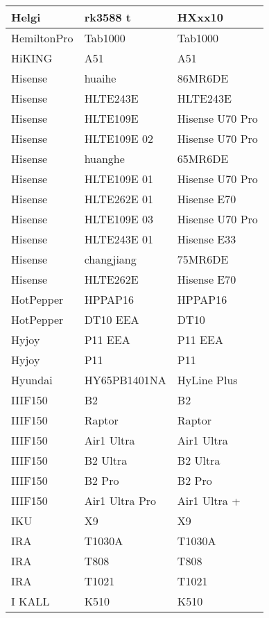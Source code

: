 \begin{tabularx}{\linewidth}{|l|X|X|}
        Helgi & rk3588 t & HXxx10 \\ \hline
        HemiltonPro & Tab1000 & Tab1000 \\ \hline
        HiKING & A51 & A51 \\ \hline
        Hisense & huaihe & 86MR6DE \\ \hline
        Hisense & HLTE243E & HLTE243E \\ \hline
        Hisense & HLTE109E & Hisense U70 Pro \\ \hline
        Hisense & HLTE109E 02 & Hisense U70 Pro \\ \hline
        Hisense & huanghe & 65MR6DE \\ \hline
        Hisense & HLTE109E 01 & Hisense U70 Pro \\ \hline
        Hisense & HLTE262E 01 & Hisense E70 \\ \hline
        Hisense & HLTE109E 03 & Hisense U70 Pro \\ \hline
        Hisense & HLTE243E 01 & Hisense E33 \\ \hline
        Hisense & changjiang & 75MR6DE \\ \hline
        Hisense & HLTE262E & Hisense E70 \\ \hline
        HotPepper & HPPAP16 & HPPAP16 \\ \hline
        HotPepper & DT10 EEA & DT10 \\ \hline
        Hyjoy & P11 EEA & P11 EEA \\ \hline
        Hyjoy & P11 & P11 \\ \hline
        Hyundai & HY65PB1401NA & HyLine Plus \\ \hline
        IIIF150 & B2 & B2 \\ \hline
        IIIF150 & Raptor & Raptor \\ \hline
        IIIF150 & Air1 Ultra & Air1 Ultra \\ \hline
        IIIF150 & B2 Ultra & B2 Ultra \\ \hline
        IIIF150 & B2 Pro & B2 Pro \\ \hline
        IIIF150 & Air1 Ultra Pro & Air1 Ultra + \\ \hline
        IKU & X9 & X9 \\ \hline
        IRA & T1030A & T1030A \\ \hline
        IRA & T808 & T808 \\ \hline
        IRA & T1021 & T1021 \\ \hline
        I KALL & K510 & K510 \\ \hline

\end{tabularx}
